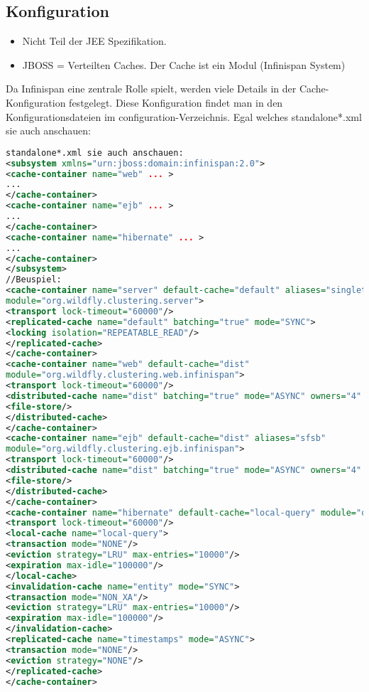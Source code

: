 \documentclass[a4paper,10pt]{scrreprt}
\begin{document}
\subsection{Konfiguration} %
\label{sub:konfiguration}
\begin{itemize}
	\item Nicht Teil der JEE Spezifikation.
	\item JBOSS = Verteilten Caches. Der Cache ist ein Modul (Infinispan System)
\end{itemize}
Da Infinispan eine zentrale Rolle spielt, werden viele Details in der Cache-Konfiguration festgelegt. Diese
Konfiguration findet man in den Konfigurationsdateien im configuration-Verzeichnis. Egal welches
standalone*.xml sie auch anschauen:
\begin{lstlisting}[caption=Standalone.xml Caching,language=xml]
	standalone*.xml sie auch anschauen:
<subsystem xmlns="urn:jboss:domain:infinispan:2.0">
<cache-container name="web" ... >
...
</cache-container>
<cache-container name="ejb" ... >
...
</cache-container>
<cache-container name="hibernate" ... >
...
</cache-container>
</subsystem>
//Beuspiel:
<cache-container name="server" default-cache="default" aliases="singleton cluster"
module="org.wildfly.clustering.server">
<transport lock-timeout="60000"/>
<replicated-cache name="default" batching="true" mode="SYNC">
<locking isolation="REPEATABLE_READ"/>
</replicated-cache>
</cache-container>
<cache-container name="web" default-cache="dist"
module="org.wildfly.clustering.web.infinispan">
<transport lock-timeout="60000"/>
<distributed-cache name="dist" batching="true" mode="ASYNC" owners="4" l1-lifespan="0">
<file-store/>
</distributed-cache>
</cache-container>
<cache-container name="ejb" default-cache="dist" aliases="sfsb"
module="org.wildfly.clustering.ejb.infinispan">
<transport lock-timeout="60000"/>
<distributed-cache name="dist" batching="true" mode="ASYNC" owners="4" l1-lifespan="0">
<file-store/>
</distributed-cache>
</cache-container>
<cache-container name="hibernate" default-cache="local-query" module="org.hibernate">
<transport lock-timeout="60000"/>
<local-cache name="local-query">
<transaction mode="NONE"/>
<eviction strategy="LRU" max-entries="10000"/>
<expiration max-idle="100000"/>
</local-cache>
<invalidation-cache name="entity" mode="SYNC">
<transaction mode="NON_XA"/>
<eviction strategy="LRU" max-entries="10000"/>
<expiration max-idle="100000"/>
</invalidation-cache>
<replicated-cache name="timestamps" mode="ASYNC">
<transaction mode="NONE"/>
<eviction strategy="NONE"/>
</replicated-cache>
</cache-container>

\end{lstlisting}
\end{document}
